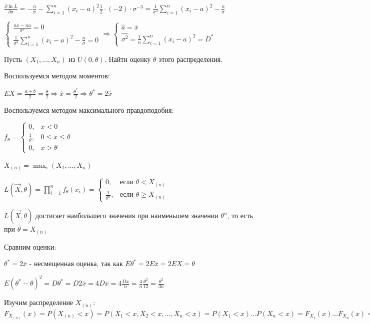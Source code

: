\documentclass[12pt]{article}
\begin{document}
$\frac{\partial \ln L}{\partial \sigma} = -\frac{n}{\sigma} - \sum_{i = 1}^n (x_i - a)^2 \frac{1}{2} \cdot (-2) \cdot \sigma^{-3} = \frac{1}{\sigma^3} \sum_{i = 1}^n (x_i - a)^2 - \frac{n}{\sigma}$

$\begin{cases}
    \frac{n\overline{x} - na}{\sigma^2} = 0 \\
    \frac{1}{\sigma^3} \sum_{i = 1}^n (x_i - a)^2 - \frac{n}{\sigma} = 0
\end{cases} \Longrightarrow \begin{cases}
    \hat{a} = \overline{x} \\
    \widehat{\sigma^2} = \frac{1}{n} \sum_{i = 1}^n (x_i - a)^2 = D^*
\end{cases} $

 Пусть $(X_1, \dots, X_n)$ из $U(0, \theta)$. Найти оценку $\theta$ этого распределения.

Воспользуемся методом моментов:

$EX = \frac{a + b}{2} = \frac{\theta}{2} \Longrightarrow \overline{x} = \frac{\theta^*}{2} \Longrightarrow \theta^* = 2\overline{x}$

Воспользуемся методом максимального правдоподобия:

$f_\theta = \begin{cases}0, & x < 0 \\ \frac{1}{\theta}, & 0 \leq x \leq \theta \\ 0, & x > \theta \end{cases}$

$X_{(n)} = \max_i (X_1, \dots, X_n)$

$L(\vec{X}, \theta) = \prod_{i = 1}^n f_\theta (x_i) = 
\begin{cases}
    0, & \text{если } \theta < X_{(n)} \\ 
    \frac{1}{\theta^n}, & \text{если } \theta \geq X_{(n)}
\end{cases}$

$L(\vec{X}, \theta)$ достигает наибольшего значения при наименьшем значении $\theta^n$, то есть при $\hat{\theta} = X_{(n)}$

Сравним оценки:

$\theta^* = 2 \overline{x}$ - несмещенная оценка, так как $E\theta^* = 2E\overline{x} = 2E X = \theta$

$E(\theta^* - \theta)^2 = D\theta^* = D2\overline{x} = 4D\overline{x} = 4\frac{Dx}{n} = \frac{4}{n}\frac{\theta^2}{12} = \frac{\theta^2}{3n}$

Изучим распределение $X_{(n)}$: $F_{X_{(n)}}(x) = P(X_{(n)} < x) = P(X_1 < x, X_2 < x, \dots, X_n < x) = 
P(X_1 < x) \dots P(X_n < x) = F_{X_1}(x) \dots F_{X_n}(x) = F^n_{(x_1)}(x)$
\end{document}
